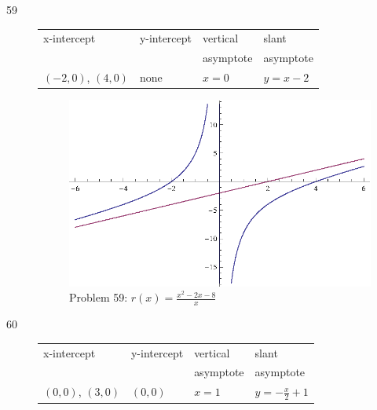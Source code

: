 \documentclass{exam}
\begin{document}
\begin{description}
    \item[59]
      \begin{tabular}{llll}
        \toprule
        x-intercept          & y-intercept & vertical  & slant \\
                             &             & asymptote & asymptote \\
        \midrule
        $(-2, 0)$, $(4, 0)$  & none        & $x = 0$   & $y = x - 2$ \\
        \bottomrule
      \end{tabular}

      \begin{figure}[H]
        \centering
        \includegraphics[scale = 0.8]{problem59.eps}
        \caption*{ Problem 59: $r(x) = \frac{x^2 - 2x - 8}{x}$ }
      \end{figure}

    \item[60]
      \begin{tabular}{llll}
        \toprule
        x-intercept        & y-intercept & vertical  & slant \\
                           &             & asymptote & asymptote \\
        \midrule
        $(0, 0)$, $(3, 0)$ & $(0, 0)$    & $x = 1$   & $y = - \frac{x}{2} + 1$ \\
        \bottomrule
      \end{tabular}


\end{description}
\end{document}
